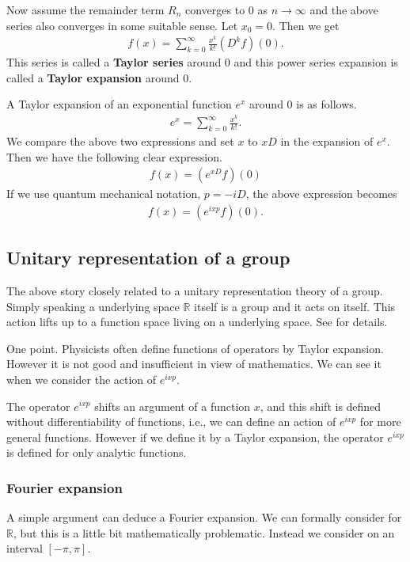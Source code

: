 \documentclass[openany, a4paper, oneside]{jsbook}
\theoremstyle{break}
\theoremstyle{breakdefn}
\newcommand{\bbR}{\mathbb{R}}
\begin{document}
Now assume the remainder term $R_n$ converges to 0 as $n \to \infty$
and the above series also converges in some suitable sense.
Let $x_0 = 0$.
Then we get
\begin{align}
 f(x)
 =
 \sum_{k=0}^{\infty} \frac{x^k}{k!} \left( D^k f \right) (0).
\end{align}
This series is called a \textbf{Taylor series} around 0 and
this power series expansion is called a \textbf{Taylor expansion} around 0.

A Taylor expansion of an exponential function $e^x$ around $0$ is as follows.
\begin{align}
 e^{x}
 =
 \sum_{k=0}^{\infty} \frac{x^k}{k!}.
\end{align}
We compare the above two expressions and
set $x$ to $x D$ in the expansion of $e^x$.
Then we have the following clear expression.
\begin{align}
 f(x)
 =
 \left( e^{xD} f \right) (0)
\end{align}
If we use quantum mechanical notation, $p = -i D$, the above expression becomes
\begin{align}
 f(x)
 =
 \left( e^{ixp} f \right) (0).
\end{align}
\subsection{Unitary representation of a group}


The above story closely related to a unitary representation theory of a group.
Simply speaking a underlying space $\bbR$ itself is a group
and it acts on itself.
This action lifts up to a function space living on a underlying space.
See \cite{KobayashiOshima1} for details.

One point.
Physicists often define functions of operators by Taylor expansion.
However it is not good and insufficient in view of mathematics.
We can see it when we consider the action of $e^{ixp}$.

The operator $e^{i x p}$ shifts an argument of a function $x$,
and this shift is defined without differentiability of functions,
i.e., we can define an action of $e^{ixp}$ for more general functions.
However if we define it by a Taylor expansion,
the operator $e^{ixp}$ is defined for only analytic functions.
\subsubsection{Fourier expansion}


A simple argument can deduce a Fourier expansion.
We can formally consider for $\bbR$,
but this is a little bit mathematically problematic.
Instead we consider on an interval $[ - \pi, \pi]$.
\end{document}
